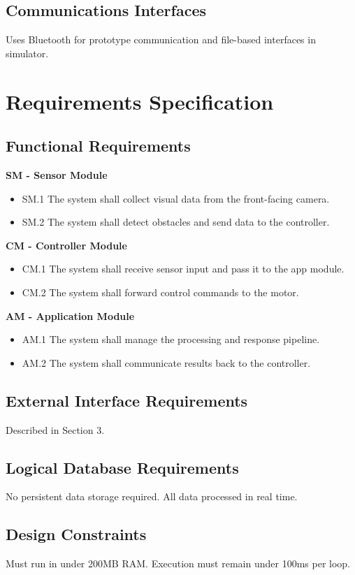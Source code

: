 \documentclass[12pt]{article}
\begin{document}
\subsection{Communications Interfaces}
Uses Bluetooth for prototype communication and file-based interfaces in simulator.

\section{Requirements Specification}
\subsection{Functional Requirements}
\textbf{SM - Sensor Module}
\begin{itemize}[noitemsep]
  \item SM.1 The system shall collect visual data from the front-facing camera.
  \item SM.2 The system shall detect obstacles and send data to the controller.
\end{itemize}

\textbf{CM - Controller Module}
\begin{itemize}[noitemsep]
  \item CM.1 The system shall receive sensor input and pass it to the app module.
  \item CM.2 The system shall forward control commands to the motor.
\end{itemize}

\textbf{AM - Application Module}
\begin{itemize}[noitemsep]
  \item AM.1 The system shall manage the processing and response pipeline.
  \item AM.2 The system shall communicate results back to the controller.
\end{itemize}

\subsection{External Interface Requirements}
Described in Section 3.

\subsection{Logical Database Requirements}
No persistent data storage required. All data processed in real time.

\subsection{Design Constraints}
Must run in under 200MB RAM. Execution must remain under 100ms per loop.
\end{document}
